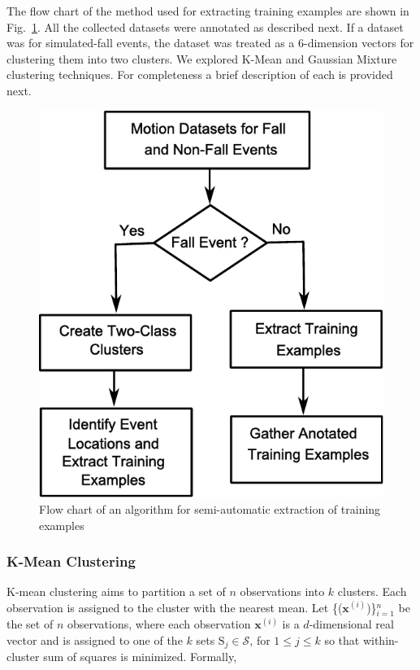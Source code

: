 \documentclass[]{IEEEtran}
\begin{document}
The flow chart of the method used for extracting training examples are shown in Fig.~\ref{fig:FlowChartforAlgorTrainingExamples}. All the collected datasets were annotated as described next. If a dataset was for simulated-fall events, the dataset was treated as a 6-dimension vectors for clustering them into two clusters. We explored K-Mean and Gaussian Mixture clustering techniques. For completeness a brief description of each is provided next.

\begin{figure}[htb]
	\centering
		\includegraphics[width = 
		0.74\columnwidth]{figures/FlowChartAlgoForTrainingExamples.pdf}
	\caption{Flow chart of an algorithm for semi-automatic extraction of training 
	examples}
	\label{fig:FlowChartforAlgorTrainingExamples}
\end{figure}

\subsubsection{K-Mean Clustering\cite{Bishop:2006:PRM:1162264}}
K-mean clustering aims to partition a set of $n$ observations into $k$ clusters. Each 
observation is assigned to the cluster with the nearest mean. Let 
\{($\mathbf{x}^{(i)}$)\}$_{i=1}^n$  be the set of $n$ 
observations, where each observation $\mathbf{x}^{(i)}$ is a $d$-dimensional real vector 
and is 
assigned to one of the $k$ sets $\mathrm{S}_j \in \mathcal{S}$, for $ 1 \leq  j \leq k$ so 
that 
within-cluster 
sum of squares is minimized. Formally,
\end{document}
